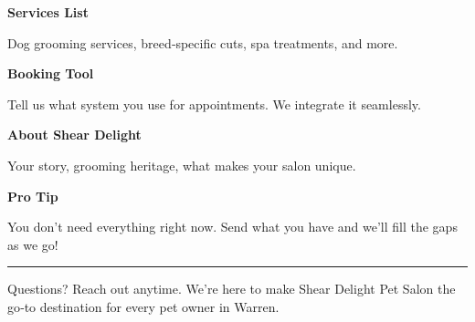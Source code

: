 \documentclass[11pt,letterpaper]{article}
\begin{document}
\hfill
\begin{minipage}[t]{0.48\textwidth}
\begin{tcolorbox}[colframe=accent-teal, boxrule=1pt, left=0.7em, right=0.7em, top=0.5em, bottom=0.5em, arc=4pt, boxsep=0pt]
{\bfseries\small\color{accent-teal}Services List}

\vspace{0.15em}

{\small Dog grooming services, breed‑specific cuts, spa treatments, and more.}
\end{tcolorbox}

\vspace{0.1em}

\begin{tcolorbox}[colframe=accent-teal, boxrule=1pt, left=0.7em, right=0.7em, top=0.5em, bottom=0.5em, arc=4pt, boxsep=0pt]
{\bfseries\small\color{accent-teal}Booking Tool}

\vspace{0.15em}

{\small Tell us what system you use for appointments. We integrate it seamlessly.}
\end{tcolorbox}

\vspace{0.1em}

\begin{tcolorbox}[colframe=accent-teal, boxrule=1pt, left=0.7em, right=0.7em, top=0.5em, bottom=0.5em, arc=4pt, boxsep=0pt]
{\bfseries\small\color{accent-teal}About Shear Delight}

\vspace{0.15em}

{\small Your story, grooming heritage, what makes your salon unique.}
\end{tcolorbox}

\vspace{-0.2em}
\end{minipage}

\vspace{0.15em}

\begin{tcolorbox}[colback={accent-red!5}, colframe=accent-red!20, boxrule=0.5pt, left=0.7em, right=0.7em, top=0.4em, bottom=0.4em, arc=6pt, boxsep=0pt]

{\bfseries\small\color{accent-red}Pro Tip}

\vspace{0.1em}

{\small You don't need everything right now. Send what you have and we'll fill the gaps as we go!}

\end{tcolorbox}

\vspace{0.15em}

\noindent\hrule
\vspace{0.2em}

{\small\color{text-light}Questions? Reach out anytime. We're here to make Shear Delight Pet Salon the go‑to destination for every pet owner in Warren.}
\end{document}

